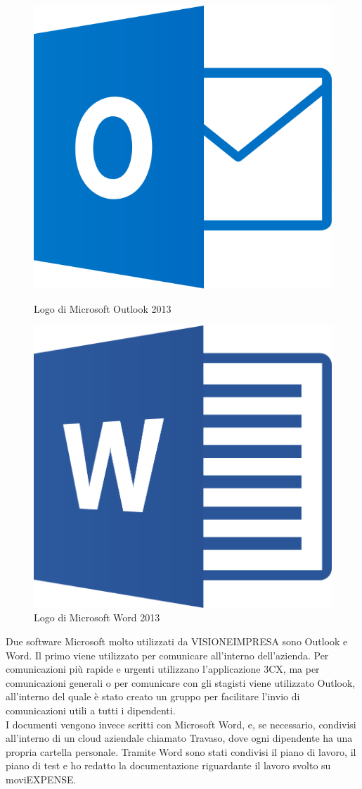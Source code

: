 \begin{figure}[H]
    \begin{minipage}[b]{0.45\textwidth}
    \centering
    \includegraphics[width=.5\textwidth]{images/loghi/outlook-logo.png}
    \caption{Logo di Microsoft Outlook 2013}
    \end{minipage}
    \hfill
    \begin{minipage}[b]{0.45\textwidth}
    \centering
    \includegraphics[width=.5\textwidth]{images/loghi/Microsoft_Word.png}
    \caption{Logo di Microsoft Word 2013}
    \end{minipage}
\end{figure}

Due software Microsoft molto utilizzati da VISIONEIMPRESA sono Outlook e Word. Il primo viene utilizzato per comunicare all'interno dell'azienda. Per comunicazioni più rapide e urgenti utilizzano l'applicazione 3CX, ma per comunicazioni generali o per comunicare con gli stagisti viene utilizzato Outlook, all'interno del quale è stato creato un gruppo per facilitare l'invio di comunicazioni utili a tutti i dipendenti.\\
I documenti vengono invece scritti con Microsoft Word, e, se necessario, condivisi all'interno di un cloud aziendale chiamato Travaso, dove ogni dipendente ha una propria cartella personale. Tramite Word sono stati condivisi il piano di lavoro, il piano di test e ho redatto la documentazione riguardante il lavoro svolto su moviEXPENSE.


